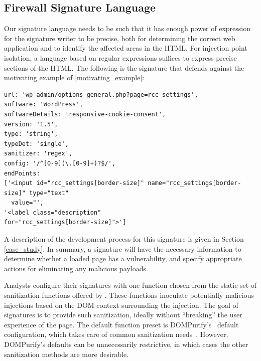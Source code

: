  \subsection{Firewall Signature Language} \label{signature_language}

 Our signature language needs to be such that it has enough power of
 expression for the signature writer to be precise, both for
 determining the correct web application and to identify the affected
 areas in the HTML. For injection point isolation, a language based on
 regular expressions suffices to express precise
 sections of the HTML. The following is the signature that defends
 against the motivating example of \autoref{motivating_example}:

 \begin{lstlisting}[breaklines=true,caption={An \sys signature},label={lst:xsnare_signature}]
url: 'wp-admin/options-general.php?page=rcc-settings',
software: 'WordPress',
softwareDetails: 'responsive-cookie-consent',
version: '1.5',
type: 'string',
typeDet: 'single',
sanitizer: 'regex',
config: '/^[0-9](\.[0-9]+)?$/',
endPoints: 
['<input id="rcc_settings[border-size]" name="rcc_settings[border-size]" type="text"
  value="',
'<label class="description" 
for="rcc_settings[border-size]">']
\end{lstlisting}

A description of the development process for this signature is given
in Section \ref{case_study}. In summary, a signature will have the
necessary information to determine whether a loaded page has a
vulnerability, and specify appropriate actions for eliminating
any malicious payloads.

Analysts configure their signatures with one
function chosen from the static set of sanitization
functions offered by \sys. These functions inoculate potentially malicious injections
based on the DOM context surrounding the injection. The goal of
signatures is to provide such sanitization, ideally without ``breaking''
the user experience of the page. The default function preset is DOMPurify's~\cite{10.1007/978-3-319-66399-9_7} default
configuration,
which takes care of common sanitization needs~\cite{safecontent}. However, DOMPurify's defaults can be unnecessarily restrictive, in which cases the other sanitization methods are more desirable.

